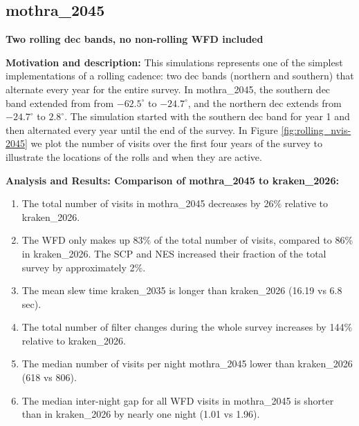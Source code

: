 \documentclass[DM,lsstdraft,authoryear,toc]{lsstdoc}
\begin{document}
\subsection{mothra\_2045} \label{mothra2045}

\textbf{Two rolling dec bands, no non-rolling WFD included}

\textbf{Motivation and description:} This simulations represents one of the simplest implementations of a rolling cadence:
two dec bands (northern and southern) that alternate every year for the entire survey. In mothra\_2045, the southern dec band extended from 
from $-62.5^{\circ}$ to $-24.7^{\circ}$, and the northern dec extends from $-24.7^{\circ}$ to $2.8^{\circ}$. The simulation started with
the southern dec band for year 1 and then alternated every year until the end of the survey. In Figure \autoref{fig:rolling_nvis-2045}
we plot the number of visits over the first four years of the survey to illustrate the locations of the rolls and when they are active.

\textbf{Analysis and Results: Comparison of mothra\_2045 to kraken\_2026:}

\begin{enumerate}
\item The total number of visits in mothra\_2045 decreases by 26$\%$ relative to kraken\_2026.
\item The WFD only makes up 83$\%$ of the total number of visits, compared to 86$\%$ in kraken\_2026.
The SCP and NES increased their fraction of the total survey by approximately 2$\%$.
\item The mean slew time kraken\_2035 is longer than kraken\_2026 (16.19 vs 6.8 sec). 
\item The total number of filter changes during the whole survey increases by 144$\%$ relative to kraken\_2026.
\item The median number of visits per night mothra\_2045 lower than kraken\_2026 (618 vs 806). 
\item The median inter-night gap for all WFD visits in mothra\_2045 is shorter than in kraken\_2026 by nearly one night (1.01 vs 1.96).
\end{enumerate}
\end{document}
